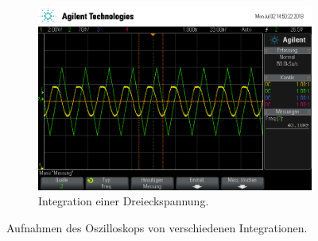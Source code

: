 \begin{figure}[ht]
\begin{subfigure}[]{\textwidth}
    \label{subfig:int_rechteck}
  \end{subfigure}
  \begin{subfigure}[]{\textwidth}
    \centering
    \includegraphics[height=0.3\textheight]{data/scope_264.png}
    \caption{Integration einer Dreieckspannung.}
    \label{subfig:int_dreieck}
  \end{subfigure}
  \caption{Aufnahmen des Oszilloskops von verschiedenen Integrationen.}
  \label{fig:integrationen}
\end{figure}

